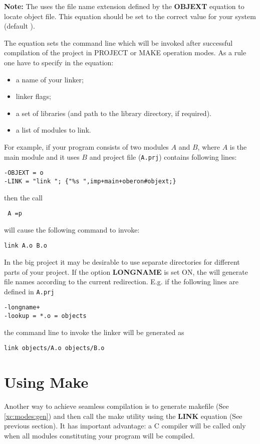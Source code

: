 {\bf Note:} The \XDS{} uses the file name extension defined
by the {\bf OBJEXT} equation to locate object file.
This equation should be set to the correct value for your system
(default {\bf \dotObj}).

The 
equation sets the command line which will be invoked after
successful compilation of the project in PROJECT or MAKE operation modes.
As a rule one have to specify in the equation:
\begin{itemize}
\item   a name of your linker;
\item   linker flags;
\item   a set of libraries (and path to the library directory, if required).
\item   a list of modules to link.
\end{itemize}
For example, if your program consists of two modules $A$ and $B$,
where $A$ is the main module and it uses $B$ and project file
({\tt A.prj}) contains following lines:
\begin{verbatim}
-OBJEXT = o
-LINK = "link "; {"%s ",imp+main+oberon#objext;}
\end{verbatim}
then the call
\begin{flushleft} \tt
        \XC{} A =p
\end{flushleft}
will cause the following command to invoke:
\begin{verbatim}
link A.o B.o
\end{verbatim}

In the big project it may be desirable to use separate directories for
different parts of your project. If the option {\bf LONGNAME} is set
ON, the \XDS{} will generate file names according to the current redirection.
E.g. if the following lines are defined in {\tt A.prj}
\begin{verbatim}
-longname+
-lookup = *.o = objects
\end{verbatim}
the command line to invoke the linker will be generated as
\begin{verbatim}
link objects/A.o objects/B.o
\end{verbatim}

\section{Using Make}\label{seamless:make}

Another way to achieve seamless compilation is to generate
makefile (See \ref{xc:modes:gen}) and then call the make
utility using the {\bf LINK} equation (See previous section).  It has
important advantage: a C compiler will be called only when all modules
constituting your program will be compiled.

